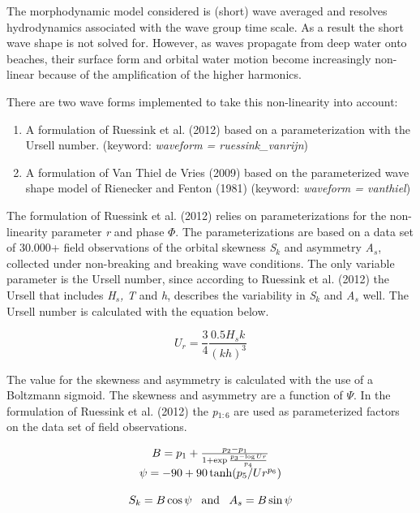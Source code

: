 \documentclass{article}
\begin{document}
\noindent The morphodynamic model considered is (short) wave averaged and resolves hydrodynamics associated with the wave group time scale. As a result the short wave shape is not solved for. However, as waves propagate from deep water onto beaches, their surface form and orbital water motion become increasingly non-linear because of the amplification of the higher harmonics.

\noindent 

\noindent There are two wave forms implemented to take this non-linearity into account:

\begin{enumerate}
\item  A formulation of Ruessink et al. (2012) based on a parameterization with the Ursell number. (keyword: \textit{waveform = ruessink\_vanrijn})

\item  A formulation of Van Thiel de Vries (2009) based on the parameterized wave shape model of Rienecker and Fenton (1981) (keyword: \textit{waveform = vanthiel})
\end{enumerate}

\noindent 

\noindent The formulation of Ruessink et al. (2012) relies on parameterizations for the non-linearity parameter \textit{r} and phase \textit{$\Phi $}. The parameterizations are based on a data set of 30.000+ field observations of the orbital skewness \textit{S${}_{k}$} and asymmetry \textit{A${}_{s}$}, collected under non-breaking and breaking wave conditions. The only variable parameter is the Ursell number, since according to Ruessink et al. (2012) the Ursell that includes \textit{H${}_{s}$,} \textit{T} and \textit{h}, describes the variability in \textit{S${}_{k}$} and \textit{A${}_{s}$} well. The Ursell number is calculated with the equation below.

\noindent 
\begin{equation} \label{2.27)} 
U_{r} =\frac{3}{4} \frac{0.5H_{s} k}{(kh)^{3} }  
\end{equation} 


\noindent The value for the skewness and asymmetry is calculated with the use of a Boltzmann sigmoid. The skewness and asymmetry are a function of \textit{$\Psi $}. In the formulation of Ruessink et al. (2012) the \textit{p${}_{1:6}$} are used as parameterized factors on the data set of field observations.

\noindent 
\begin{equation} \label{2.28)} 
\begin{array}{c} {B=p_{1} +\frac{p_{2} -p_{1} }{1+\exp \frac{p_{3} -\log Ur}{p_{4} } } } \\ {\psi =-90+90\tanh (p_{5} /Ur^{p_{6} } )} \\ {} \\ {S_{k} =B\cos \psi {\rm \; \; \; and\; \; \; }A_{s} =B\sin \psi } \end{array} 
\end{equation} 
\end{document}
